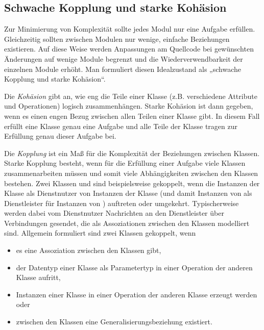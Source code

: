 \subsection{Schwache Kopplung und starke Kohäsion}
\label{sec:Kap-9.1.2}

Zur Minimierung von Komplexität sollte jedes Modul nur eine Aufgabe erfüllen. Gleichzeitig sollten zwischen Modulen nur wenige, einfache Beziehungen existieren. Auf diese Weise werden Anpassungen am Quellcode bei gewünschten Änderungen auf wenige Module begrenzt und die Wiederverwendbarkeit der einzelnen Module erhöht. Man formuliert diesen Idealzustand als „schwache Kopplung und starke Kohäsion“.

Die \textit{Kohäsion} 
gibt an, wie eng die Teile einer Klasse (z.B. verschiedene Attribute und Operationen) logisch zusammenhängen. Starke Kohäsion ist dann gegeben, wenn es einen engen Bezug zwischen allen Teilen einer Klasse gibt. In diesem Fall erfüllt eine Klasse genau eine Aufgabe und alle Teile der Klasse tragen zur Erfüllung genau dieser Aufgabe bei. 

Die \textit{Kopplung} 
ist ein Maß für die Komplexität der Beziehungen zwischen Klassen. Starke Kopplung besteht, wenn für die Erfüllung einer Aufgabe viele Klassen zusammenarbeiten müssen und somit viele Abhängigkeiten zwischen den Klassen bestehen. Zwei Klassen  und  sind beispielsweise gekoppelt, wenn die Instanzen der Klasse  als Dienstnutzer von Instanzen der Klasse  (und damit Instanzen von  als Dienstleister für Instanzen von ) auftreten oder umgekehrt. Typischerweise werden dabei vom Dienstnutzer Nachrichten an den Dienstleister über Verbindungen gesendet, die als Assoziationen zwischen den Klassen modelliert sind. Allgemein formuliert sind zwei Klassen gekoppelt, wenn 

\begin{itemize}
	\item es eine Assoziation zwischen den Klassen gibt,
	\item der Datentyp einer Klasse als Parametertyp in einer Operation der anderen Klasse aufritt,
	\item Instanzen einer Klasse in einer Operation der anderen Klasse erzeugt werden oder
	\item zwischen den Klassen eine Generalisierungsbeziehung existiert.
\end{itemize}

